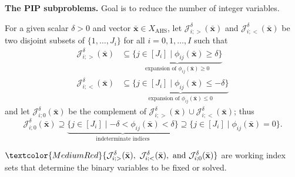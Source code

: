 \documentclass[aspectratio=169,xcolor=dvipsnames]{beamer}
\begin{document}
\begin{frame}
  \footnotesize
  \setlength{\abovedisplayskip}{4pt}
  \setlength{\belowdisplayskip}{4pt}

  {\color{MediumBlue}\textbf{The PIP subproblems.}} Goal is to reduce the
  number of integer variables.

  \vspace{0.04cm}
  For a given scalar $\delta>0$ and vector $\bar{\mathbf{x}}\in
  X_{\mathrm{AHS}}$, let $\mathcal{J}^\delta_{i;>}(\bar{\mathbf{x}})$ and
  $\mathcal{J}^\delta_{i;<}(\bar{\mathbf{x}})$ be two disjoint subsets of
  $\{1,\ldots,J_i\}$ for all $i=0,1,\ldots,I$ such that
  \[
    \begin{aligned}
      \mathcal{J}^\delta_{i;>}(\bar{\mathbf{x}}) &\subseteq
        \underbrace{\bigl\{j\in[J_i]\mid\phi_{ij}(\bar{\mathbf{x}})\geq\delta
          \bigr\}}_{\text{expansion of }\phi_{ij}(\bar{\mathbf{x}})\geq 0}\\[6pt]
      \mathcal{J}^\delta_{i;<}(\bar{\mathbf{x}}) &\subseteq
        \underbrace{\bigl\{j\in[J_i]\mid\phi_{ij}(\bar{\mathbf{x}})\leq-\delta
          \bigr\}}_{\text{expansion of }\phi_{ij}(\bar{\mathbf{x}})\leq 0}
    \end{aligned}\tag{5}
  \]
  and let $\mathcal{J}^\delta_{i;0}(\bar{\mathbf{x}})$ be the complement of
  $\mathcal{J}^\delta_{i;>}(\bar{\mathbf{x}})\cup
  \mathcal{J}^\delta_{i;<}(\bar{\mathbf{x}})$; thus
  \[
    \mathcal{J}^\delta_{i;0}(\bar{\mathbf{x}})\supseteq
      \underbrace{\bigl\{j\in[J_i]\mid -\delta<\phi_{ij}(\bar{\mathbf{x}})
        <\delta\bigr\}}_{\text{indeterminate indices}}
      \supseteq\bigl\{j\in[J_i]\mid\phi_{ij}(\bar{\mathbf{x}})=0\bigr\}.
  \]

  \vspace{0.02cm}
  $\textcolor{MediumRed}{\mathcal{J}^\delta_{i;>}(\bar{\mathbf{x}}),\
    \mathcal{J}^\delta_{i;<}(\bar{\mathbf{x}}),\text{ and }
    \mathcal{J}^\delta_{i;0}(\bar{\mathbf{x}})}$ are
  \textcolor{MediumRed}{working} index sets that determine the binary
  variables to be fixed or solved.
\end{frame}
\end{document}
